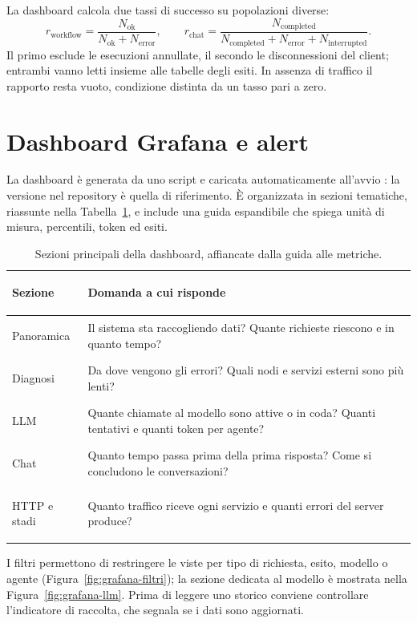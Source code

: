 La dashboard calcola due tassi di successo su popolazioni diverse:
\[
 r_{\mathrm{workflow}} =
 \frac{N_{\mathrm{ok}}}{N_{\mathrm{ok}}+N_{\mathrm{error}}},
 \qquad
 r_{\mathrm{chat}} =
 \frac{N_{\mathrm{completed}}}
 {N_{\mathrm{completed}}+N_{\mathrm{error}}+N_{\mathrm{interrupted}}}.
\]
Il primo esclude le esecuzioni annullate, il secondo le disconnessioni del
client; entrambi vanno letti insieme alle tabelle degli esiti. In assenza di
traffico il rapporto resta vuoto, condizione distinta da un tasso pari a zero.

\section{Dashboard Grafana e alert}

La dashboard è generata da uno script e caricata automaticamente all'avvio
\cite{grafanaProvisioning}: la versione nel repository è quella di
riferimento. È organizzata in sezioni tematiche, riassunte nella
Tabella~\ref{tab:viste-osservabilita}, e include una guida espandibile che
spiega unità di misura, percentili, token ed esiti.

\begin{table}[htbp]
\centering
\small
\begin{tabularx}{\textwidth}{>{\bfseries\raggedright\arraybackslash}p{}
    >{\raggedright\arraybackslash}X}
\toprule
Sezione & Domanda a cui risponde \\
\midrule
Panoramica & Il sistema sta raccogliendo dati? Quante richieste riescono e in
quanto tempo? \\
\addlinespace
Diagnosi & Da dove vengono gli errori? Quali nodi e servizi esterni sono più
lenti? \\
\addlinespace
LLM & Quante chiamate al modello sono attive o in coda? Quanti tentativi e
quanti token per agente? \\
\addlinespace
Chat & Quanto tempo passa prima della prima risposta? Come si concludono le
conversazioni? \\
\addlinespace
HTTP e stadi & Quanto traffico riceve ogni servizio e quanti errori del
server produce? \\
\bottomrule
\end{tabularx}
\caption{Sezioni principali della dashboard, affiancate dalla guida alle metriche.}
\label{tab:viste-osservabilita}
\end{table}

I filtri permettono di restringere le viste per tipo di richiesta, esito,
modello o agente (Figura~\ref{fig:grafana-filtri}); la sezione dedicata al
modello è mostrata nella Figura~\ref{fig:grafana-llm}. Prima di leggere uno
storico conviene controllare l'indicatore di raccolta, che segnala se i dati
sono aggiornati.

